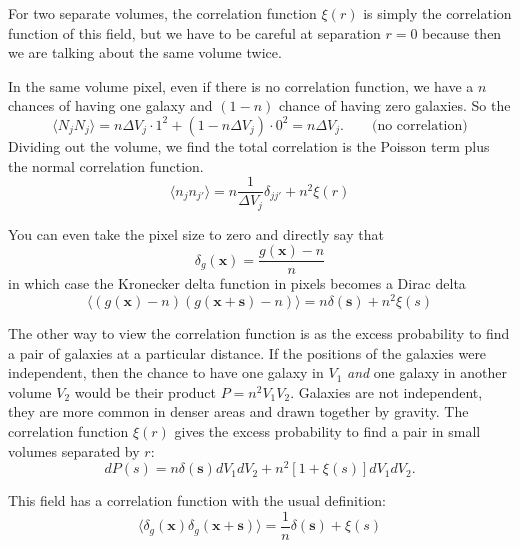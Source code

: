 For two separate volumes, the correlation function $\xi(r)$ is simply the correlation function of this field, but we have to be careful at separation $r=0$ because then we are talking about the same volume twice.


In the same volume pixel, even if there is no correlation function, we have a $n$ chances of having one galaxy and $(1-n)$ chance of having zero galaxies.  So the \begin{equation}\langle N_j N_j \rangle = n \Delta V_j \cdot 1^2 + (1-n \Delta V_j) \cdot 0^2 = n \Delta V_j. \qquad \mbox{(no correlation)}\end{equation}  Dividing out the volume, we find the total correlation is the Poisson term plus the normal correlation function.
\begin{equation}
 \langle n_j n_{j'} \rangle = n \frac{1}{\Delta V_j} \delta_{jj'} + n^2 \xi(r)
\end{equation}

You can even take the pixel size to zero and directly say that
\begin{equation}
  \delta_g(\mathbf x) = \frac{g(\mathbf x) - n }{n}
\end{equation}
 in which case the Kronecker delta function in pixels becomes a Dirac delta  
\begin{equation}
 \langle (g(\mathbf{x})-n) (g(\mathbf{x+s}) - n) \rangle = n \delta(\mathbf s) + n^2 \xi(s)
\end{equation}

The other way to view the correlation function is as the excess probability to find a pair of galaxies at a particular distance.   If the positions of the galaxies were independent, then the chance to have one galaxy in $V_1$ \textit{and} one galaxy in another volume $V_2$ would be their product $P = n^2 V_1 V_2$.  Galaxies are not independent, they are more common in denser areas and drawn together by gravity.  The correlation function $\xi(r)$ gives the excess probability to find a pair in small volumes separated by $r$:
\begin{equation}
  dP(s) = n \delta(\mathbf s) dV_1 dV_2 +   n^2 [ 1+\xi(s) ] dV_1 dV_2.
\end{equation}



This field has a correlation function with the usual definition:
\begin{equation}
\langle  \delta_g(\mathbf{x}) \delta_g(\mathbf{x + s})  \rangle = \frac{1}{n} \delta(\mathbf s) +  \xi(s)
\end{equation}

